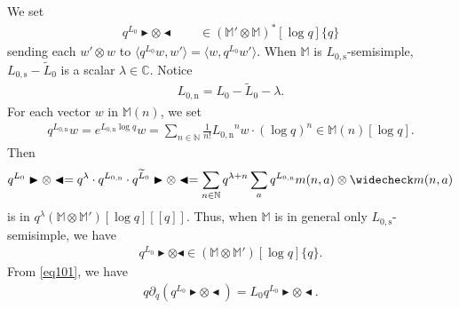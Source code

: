 \documentclass[12pt,a4paper,notitlepage]{article}
\theoremstyle{definition}
\theoremstyle{plain}
\newcommand{\wtd}{\widetilde}
\newcommand{\wch}{\widecheck}
\newcommand{\bk}[1]{\langle {#1}\rangle}
\newcommand{\Mbb}{\mathbb M}
\newcommand{\Cbb}{\mathbb C}
\newcommand{\Nbb}{\mathbb N}
\newcommand{\btl}{\blacktriangleleft}
\newcommand{\btr}{\blacktriangleright}
\newcommand{\Lss}{{L_{0,\mathrm{s}}}}
\newcommand{\Lni}{{L_{0,\mathrm{n}}}}
\numberwithin{equation}{section}
\begin{document}
We set
\begin{align}
q^{L_0}\btr\otimes\btl\qquad\in(\Mbb'\otimes\Mbb)^*[\log q]\{q\}\label{eq109}
\end{align}
sending each $w'\otimes w$ to $\bk{q^{L_0}w,w'}=\bk{w,q^{L_0}w'}$. When $\Mbb$ is $\Lss$-semisimple, $\Lss-\wtd L_0$ is a scalar $\lambda\in\Cbb$.  Notice 
\begin{align}\label{eq100}
\Lni=L_0-\wtd L_0-\lambda.
\end{align}
For each vector $w$ in $\Mbb(n)$, we set
\begin{align*}
q^\Lni w=e^{\Lni\log q}w=\sum_{n\in\Nbb}\frac 1{n!}\Lni^nw\cdot (\log q)^n\in	\Mbb(n)[\log q].
\end{align*}
Then
\begin{align}
q^{L_0}\btr\otimes\btl=q^\lambda\cdot q^{\Lni}\cdot q^{\wtd L_0}\btr\otimes\btl=\sum_{n\in\Nbb}q^{\lambda+n}\sum_a q^\Lni m(n,a)\otimes\wch m(n,a)
\end{align}
is in $q^{\lambda}(\Mbb\otimes\Mbb')[\log q][[q]]$. Thus, when $\Mbb$ is in general only $\Lss$-semisimple, we have
\begin{align}
q^{L_0}\btr\otimes\btl\in(\Mbb\otimes\Mbb')[\log q]\{q\}.	
\end{align}
From \eqref{eq101}, we have
\begin{align}
q\partial_q (q^{L_0}\btr\otimes\btl)=L_0q^{L_0}\btr\otimes\btl.\label{eq102}	
\end{align} 
\end{document}

